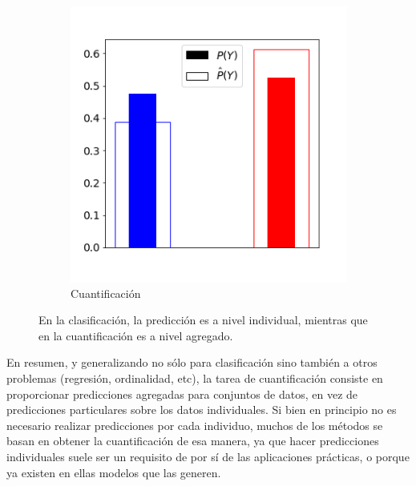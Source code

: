 \begin{figure}[H]
\begin{subfigure}[t]{0.4\textwidth}
        \includegraphics[width=\textwidth]{../plots_teoria/intro_barplot.png}
        \caption{Cuantificación}
    \end{subfigure}
    \caption{En la clasificación, la predicción es a nivel individual, mientras
    que en la cuantificación es a nivel agregado.}\label{fig:intro}
\end{figure}

En resumen, y generalizando no sólo para clasificación sino también a otros
problemas (regresión, ordinalidad, etc), la tarea de cuantificación consiste en
proporcionar predicciones agregadas para conjuntos de datos, en vez de
predicciones particulares sobre los datos individuales. Si bien en principio no
es necesario realizar predicciones por cada individuo, muchos de los métodos se
basan en obtener la cuantificación de esa manera, ya que hacer predicciones
individuales suele ser un requisito de por sí de las aplicaciones prácticas, o
porque ya existen en ellas modelos que las generen.

